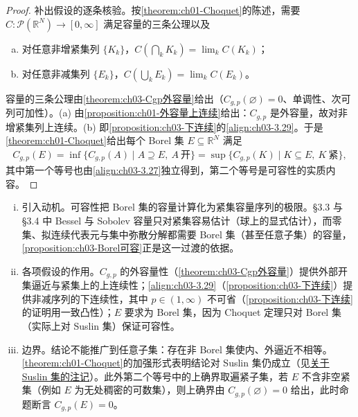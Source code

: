 \documentclass[../../main.tex]{subfiles}%
\begin{document}
\begin{proof}
补出假设的逐条核验。按\cref{theorem:ch01-Choquet}的陈述，需要 $C:\mathcal{P}(\mathbb{R}^N)\to[0,\infty]$ 满足容量的三条公理以及
\begin{enumerate}[(a)]
\item 对任意非增紧集列 $\{K_k\}$，$C\left(\bigcap_kK_k\right)=\lim_kC(K_k)$；
\item 对任意非减集列 $\{E_k\}$，$C\left(\bigcup_kE_k\right)=\lim_kC(E_k)$。
\end{enumerate}
容量的三条公理由\cref{theorem:ch03-Cgp外容量}给出（$C_{g,p}(\varnothing)=0$、单调性、次可列可加性）。(a) 由\cref{proposition:ch01-外容量上连续}给出：$C_{g,p}$ 是外容量，故对非增紧集列上连续。(b) 即\cref{proposition:ch03-下连续}的\eqref{align:ch03-3.29}。于是\cref{theorem:ch01-Choquet}给出每个 Borel 集 $E\subseteq\mathbb{R}^N$ 满足
\begin{align*}
C_{g,p}(E)=\inf\{C_{g,p}(A)\mid A\supseteq E,\ A\ \text{开}\}=\sup\{C_{g,p}(K)\mid K\subseteq E,\ K\ \text{紧}\},
\end{align*}
其中第一个等号也由\eqref{align:ch03-3.27}独立得到，第二个等号是可容性的实质内容。
\end{proof}

\begin{remark}\label{remark:ch03-Borel可容}
\begin{enumerate}[(i)]
\item 引入动机。可容性把 Borel 集的容量计算化为紧集容量序列的极限。\S3.3 与 \S3.4 中 Bessel 与 Sobolev 容量只对紧集容易估计（球上的显式估计），而零集、拟连续代表元与集中弥散分解都需要 Borel 集（甚至任意子集）的容量，\cref{proposition:ch03-Borel可容}正是这一过渡的依据。

\item 各项假设的作用。$C_{g,p}$ 的外容量性（\cref{theorem:ch03-Cgp外容量}）提供外部开集逼近与紧集上的上连续性；\eqref{align:ch03-3.29}（\cref{proposition:ch03-下连续}）提供非减序列的下连续性，其中 $p\in(1,\infty)$ 不可省（\cref{proposition:ch03-下连续}的证明用一致凸性）；$E$ 要求为 Borel 集，因为 Choquet 定理只对 Borel 集（实际上对 Suslin 集）保证可容性。

\item 边界。结论不能推广到任意子集：存在非 Borel 集使内、外逼近不相等。\cref{theorem:ch01-Choquet}的加强形式表明结论对 Suslin 集仍成立（见\hyperref[remark:ch01-Suslin集]{关于 Suslin 集的注记}）。此外第二个等号中的上确界取遍紧子集，若 $E$ 不含非空紧集（例如 $E$ 为无处稠密的可数集），则上确界由 $C_{g,p}(\varnothing)=0$ 给出，此时命题断言 $C_{g,p}(E)=0$。
\end{enumerate}
\end{remark}
\end{document}
